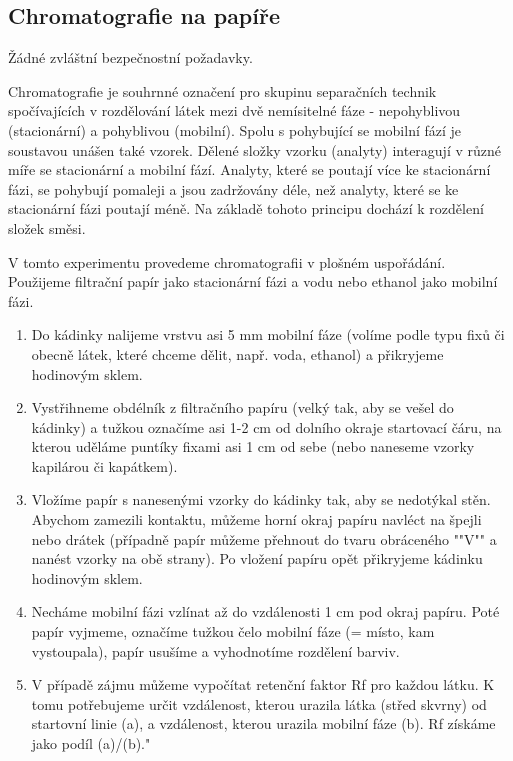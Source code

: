 \subsection{Chromatografie na papíře}


Žádné zvláštní bezpečnostní požadavky.

\hspace{-21px} 

Chromatografie je souhrnné označení pro skupinu separačních technik spočívajících v rozdělování látek mezi dvě nemísitelné fáze - nepohyblivou (stacionární) a pohyblivou (mobilní). Spolu s pohybující se mobilní fází je soustavou unášen také vzorek. Dělené složky vzorku (analyty) interagují v různé míře se stacionární a mobilní fází. Analyty, které se poutají více ke stacionární fázi, se pohybují pomaleji a jsou zadržovány déle, než analyty, které se ke stacionární fázi poutají méně. Na základě tohoto principu dochází k rozdělení složek směsi.

V tomto experimentu provedeme chromatografii v plošném uspořádání. Použijeme filtrační papír jako stacionární fázi a vodu nebo ethanol jako mobilní fázi. \newline

\hspace{-21px} 

\begin{enumerate}
\item Do kádinky nalijeme vrstvu asi 5 mm mobilní fáze (volíme podle typu fixů či obecně látek, které chceme dělit, např. voda, ethanol) a přikryjeme hodinovým sklem.
\item Vystřihneme obdélník z filtračního papíru (velký tak, aby se vešel do kádinky) a tužkou označíme asi 1-2 cm od dolního okraje startovací čáru, na kterou uděláme puntíky fixami asi 1 cm od sebe (nebo naneseme vzorky kapilárou či kapátkem).
\item Vložíme papír s nanesenými vzorky do kádinky tak, aby se nedotýkal stěn. Abychom zamezili kontaktu, můžeme horní okraj papíru navléct na špejli nebo drátek (případně papír můžeme přehnout do tvaru obráceného ""V"" a nanést vzorky na obě strany). Po vložení papíru opět přikryjeme kádinku hodinovým sklem.
\item Necháme mobilní fázi vzlínat až do vzdálenosti 1 cm pod okraj papíru. Poté papír vyjmeme, označíme tužkou čelo mobilní fáze (= místo, kam vystoupala), papír usušíme a vyhodnotíme rozdělení barviv.
\item V případě zájmu můžeme vypočítat retenční faktor Rf pro každou látku. K tomu potřebujeme určit vzdálenost, kterou urazila látka (střed skvrny) od startovní linie (a), a vzdálenost, kterou urazila mobilní fáze (b). Rf získáme jako podíl (a)/(b)."
\end{enumerate}

